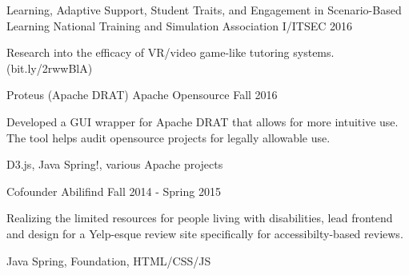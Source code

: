 

\begin{cventries}

  \cventry
    {Learning, Adaptive Support, Student Traits, and Engagement in Scenario-Based Learning} %
    {National Training and Simulation Association} %
    {I/ITSEC 2016} %
    {
      \begin{cvitems} %
        \item {Research into the efficacy of VR/video game-like tutoring systems. (bit.ly/2rwwBlA)}
      \end{cvitems}
    }

  \cventry
    {Proteus (Apache DRAT)} %
    {Apache Opensource} %
    {Fall 2016} %
    {
      \begin{cvitems} %
        \item {Developed a GUI wrapper for Apache DRAT that allows for more intuitive use. The tool helps audit opensource projects for legally allowable use.}
        \item {D3.js, Java Spring!, various Apache projects}
      \end{cvitems}
    }

  \cventry
    {Cofounder} %
    {Abilifind} %
    {Fall 2014 - Spring 2015} %
    {
      \begin{cvitems} %
        \item {Realizing the limited resources for people living with disabilities, lead frontend and design for a Yelp-esque review site specifically for accessibilty-based reviews.}
        \item {Java Spring, Foundation, HTML/CSS/JS}
      \end{cvitems}
    }

\end{cventries}
